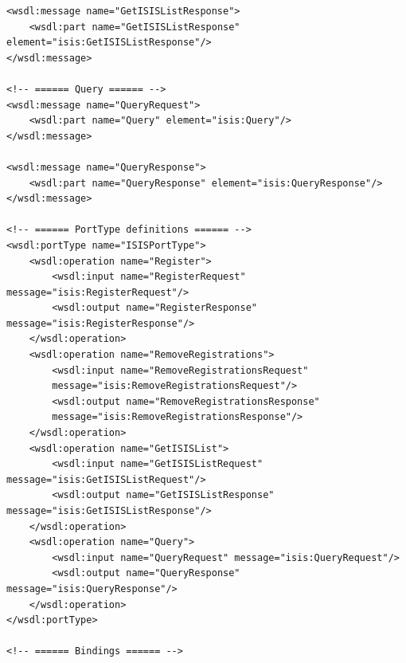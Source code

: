\documentclass{book}
\begin{document}
\begin{verbatim}
<wsdl:message name="GetISISListResponse">
    <wsdl:part name="GetISISListResponse" element="isis:GetISISListResponse"/>
</wsdl:message>

<!-- ====== Query ====== -->
<wsdl:message name="QueryRequest">
    <wsdl:part name="Query" element="isis:Query"/>
</wsdl:message>

<wsdl:message name="QueryResponse">
    <wsdl:part name="QueryResponse" element="isis:QueryResponse"/>
</wsdl:message>

<!-- ====== PortType definitions ====== -->
<wsdl:portType name="ISISPortType">
    <wsdl:operation name="Register">
        <wsdl:input name="RegisterRequest" message="isis:RegisterRequest"/>
        <wsdl:output name="RegisterResponse" message="isis:RegisterResponse"/>
    </wsdl:operation>
    <wsdl:operation name="RemoveRegistrations">
        <wsdl:input name="RemoveRegistrationsRequest" 
        message="isis:RemoveRegistrationsRequest"/>
        <wsdl:output name="RemoveRegistrationsResponse" 
        message="isis:RemoveRegistrationsResponse"/>
    </wsdl:operation>
    <wsdl:operation name="GetISISList">
        <wsdl:input name="GetISISListRequest" message="isis:GetISISListRequest"/>
        <wsdl:output name="GetISISListResponse" message="isis:GetISISListResponse"/>
    </wsdl:operation>
    <wsdl:operation name="Query">
        <wsdl:input name="QueryRequest" message="isis:QueryRequest"/>
        <wsdl:output name="QueryResponse" message="isis:QueryResponse"/>
    </wsdl:operation>
</wsdl:portType>

<!-- ====== Bindings ====== -->


\end{verbatim}
\end{document}
